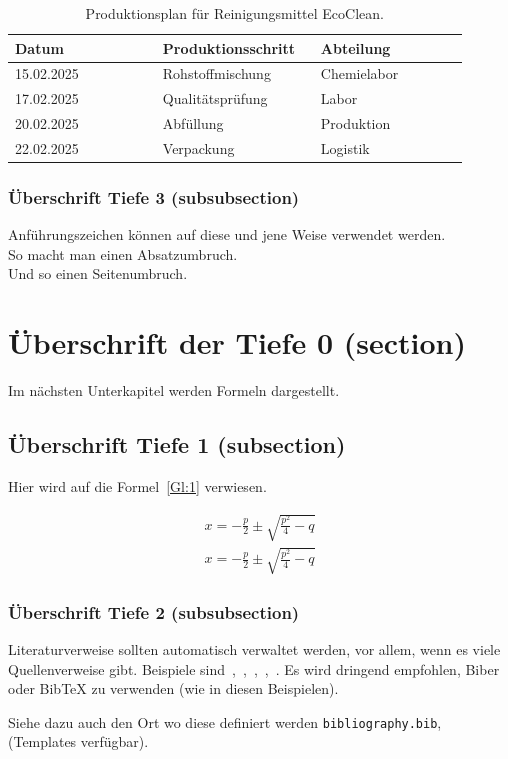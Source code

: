         \begin{table}[!htbp]
            \centering
            \begin{tabular}{| p{0.3\linewidth} | p{0.3\linewidth} | p{0.3\linewidth} |}\hline
            Datum & Produktionsschritt & Abteilung\\\hline
            15.02.2025 & Rohstoffmischung & Chemielabor\\
            17.02.2025 & Qualitätsprüfung & Labor\\
            20.02.2025 & Abfüllung & Produktion\\
            22.02.2025 & Verpackung & Logistik\\\hline
            \end{tabular}
            \caption{Produktionsplan für Reinigungsmittel \glqq{} EcoClean\grqq{}.}\label{tab:1}
        \end{table}



        
        \subsubsection{Überschrift Tiefe 3 (subsubsection)}
        Anführungszeichen können auf \glq{}diese\grq{} und \glqq{}jene\grqq{} Weise verwendet werden.\\

        So macht man einen Absatzumbruch.\\
        Und so einen Seitenumbruch.\clearpage


\section{Überschrift der Tiefe 0 (section)}
Im nächsten Unterkapitel werden Formeln dargestellt.


    \subsection{Überschrift Tiefe 1 (subsection)}
    Hier wird auf die Formel~\ref{Gl:1} verwiesen.

    \begin{align}
        x = -\frac{p}{2}\pm\sqrt{\frac{p^2}{4}-q}\label{Gl:1}
    \end{align}
    \begin{align}
        x = -\frac{p}{2}\pm\sqrt{\frac{p^2}{4}-q}\label{Gl:2}
    \end{align}

        \subsubsection{Überschrift Tiefe 2 (subsubsection)}
        Literaturverweise sollten automatisch verwaltet werden, vor allem, wenn es viele Quellenverweise gibt. 
        Beispiele sind~\cite{Ko05a},~\cite{Ko05b},~\cite{MiGo05},~\cite{TeGo14},~\cite{HuHa07}.
        Es wird dringend empfohlen, Biber oder BibTeX zu verwenden (wie in diesen Beispielen).
        
        Siehe dazu auch den Ort wo diese definiert werden \verb|bibliography.bib|, (Templates verfügbar).

    

\clearpage